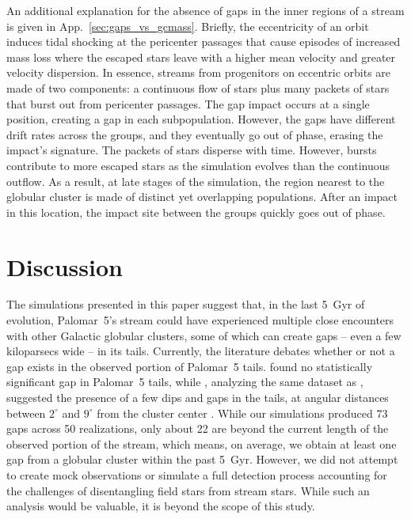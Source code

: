 \documentclass{aa}
\begin{document}
    An additional explanation for the absence of gaps in the inner regions of a stream is given in App.~\ref{sec:gaps_vs_gcmass}. Briefly, the eccentricity of an orbit induces tidal shocking at the pericenter passages that cause episodes of increased mass loss where the escaped stars leave with a higher mean velocity and greater velocity dispersion. In essence, streams from progenitors on eccentric orbits are made of two components: a continuous flow of stars plus many packets of stars that burst out from pericenter passages. The gap impact occurs at a single position, creating a gap in each subpopulation. However, the gaps have different drift rates across the groups, and they eventually go out of phase, erasing the impact's signature. The packets of stars disperse with time. However, bursts contribute to more escaped stars as the simulation evolves than the continuous outflow. As a result, at late stages of the simulation, the region nearest to the globular cluster is made of distinct yet overlapping populations. After an impact in this location, the impact site between the groups quickly goes out of phase. 

  
  
\section{Discussion}\label{sec:discussion}
  
  The simulations presented in this paper suggest that, in the last 5~Gyr of evolution, Palomar~5's stream could have experienced multiple close encounters with other Galactic globular clusters, some of which can create gaps -- even a few kiloparsecs wide -- in its tails. Currently, the literature debates whether or not a gap exists in the observed portion of Palomar~5 tails. \citet{2016ApJ...819....1I} found no statistically significant gap in Palomar~5 tails, while \citet{2017MNRAS.470...60E}, analyzing the same dataset as \citet{2016ApJ...819....1I}, suggested the presence of a few dips and gaps in the tails, at angular distances between $2^\circ$ and $9^\circ$ from the cluster center \citep[see also][]{ 2020ApJ...889...70B}. While our simulations produced 73 gaps across 50 realizations, only about 22 are beyond the current length of the observed portion of the stream, which means, on average, we obtain at least one gap from a globular cluster within the past 5~Gyr. However, we did not attempt to create mock observations or simulate a full detection process accounting for the challenges of disentangling field stars from stream stars. While such an analysis would be valuable, it is beyond the scope of this study.
\end{document}
